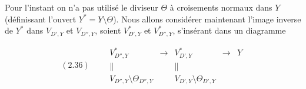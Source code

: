 \documentclass[11pt,a4paper]{article}
\begin{document}
 Pour l'instant on n'a pas utilisé le diviseur $\Theta$ à croisements normaux dans $Y$ (définissant l'ouvert $Y^*=Y\setminus\Theta$). Nous allons considérer maintenant l'image inverse de $Y^*$ dans $V_{D',Y}$ et $V_{D'',Y}$, soient $V^*_{D',Y}$ et $V^*_{D'',Y}$, s'insérant dans un diagramme

\[
(2.36)\qquad
\begin{array}{ccccc}
V^*_{D'',Y} & \longrightarrow & V^*_{D',Y} & \longrightarrow & Y\\
\| & & \| & & \\
V_{D'',Y}\setminus\Theta_{D'',Y} & & V_{D',Y}\setminus\Theta_{D',Y} & &
\end{array}
\]

\end{document}
